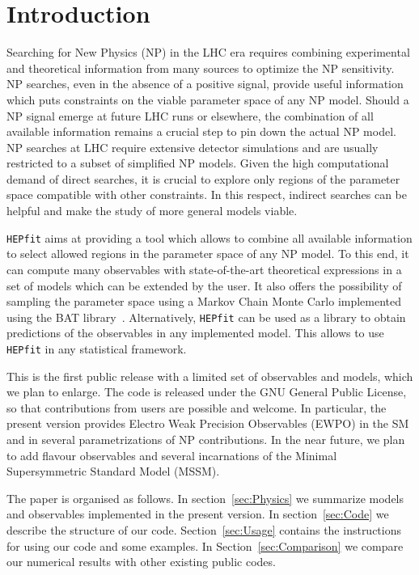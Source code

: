\documentclass[aps,superscriptaddress,nofootinbib,floatfix,notitlepage]{revtex4-1}
\newcommand{\HEPfit}{\texttt{HEPfit}\xspace}
\begin{document}
\maketitle

\section{Introduction}
Searching for New Physics (NP) in the LHC era requires combining
experimental and theoretical information from many sources to optimize
the NP sensitivity. NP searches, even in the absence of a positive
signal, provide useful information which puts constraints on the
viable parameter space of any NP model. Should a NP signal emerge at
future LHC runs or elsewhere, the combination of all available
information remains a crucial step to pin down the actual NP model.
NP searches at LHC require extensive detector simulations and are
usually restricted to a subset of simplified NP models. Given the high
computational demand of direct searches, it is crucial to explore only
regions of the parameter space compatible with other constraints. In
this respect, indirect searches can be helpful and make the study of
more general models viable.

\HEPfit aims at providing a tool which allows to combine all
available information to select allowed regions in the parameter space
of any NP model. To this end, it can compute many observables with
state-of-the-art theoretical expressions in a set of models which can
be extended by the user. It also offers the possibility of sampling
the parameter space using a Markov Chain Monte Carlo implemented using
the BAT library~\cite{arXiv:0808.2552}. Alternatively, \HEPfit can be
used as a library to obtain predictions of the observables in any
implemented model. This allows to use \HEPfit in any statistical
framework.

This is the first public release with a limited set of observables and
models, which we plan to enlarge. The code is released under the GNU
General Public License, so that contributions from users are possible
and welcome. In particular, the present version provides Electro Weak
Precision Observables (EWPO) in the SM and in several parametrizations
of NP contributions. In the near future, we plan to add flavour
observables and several incarnations of the Minimal Supersymmetric
Standard Model (MSSM).

The paper is organised as follows. In section~\ref{sec:Physics} we
summarize models and observables implemented in the present
version. In section~\ref{sec:Code} we describe the structure of our
code. Section~\ref{sec:Usage} contains the instructions for using our
code and some examples. In Section~\ref{sec:Comparison} we compare our
numerical results with other existing public codes.
\end{document}
